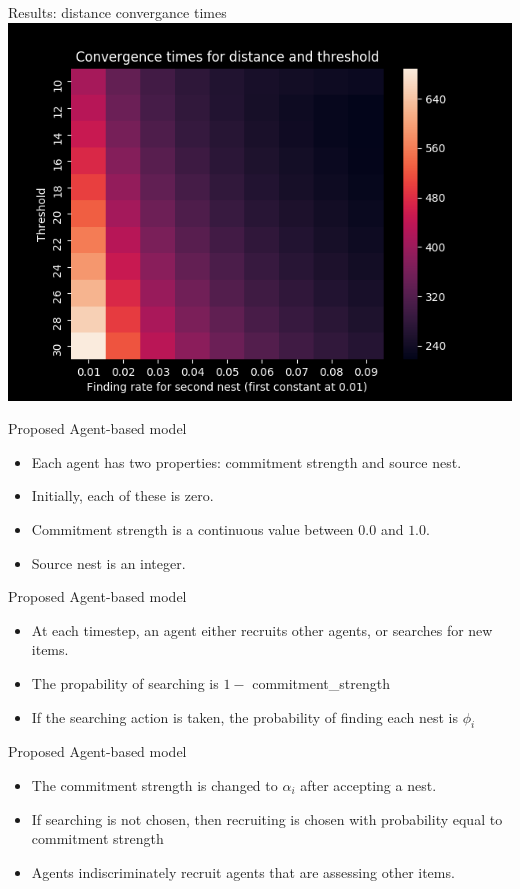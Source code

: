 \documentclass{beamer}
\begin{document}
\begin{frame}{Results: distance convergance times}
    \includegraphics[scale=0.7]{distance_convergance_times_t_over_10}
\end{frame}

\begin{frame}{Proposed Agent-based model}
    \begin{itemize}
        \item Each agent has two properties: commitment strength and source nest.
        \item Initially, each of these is zero.
        \item Commitment strength is a continuous value between $0.0$ and $1.0$.
        \item Source nest is an integer.
    \end{itemize}
\end{frame}

\begin{frame}{Proposed Agent-based model}
    \begin{itemize}
        \item At each timestep, an agent either recruits other agents, or searches for new items.
        \item The propability of searching is $1 - $ commitment\_strength
        \item If the searching action is taken, the probability of finding each nest is $\phi_i$
    \end{itemize}
\end{frame}

\begin{frame}{Proposed Agent-based model}
    \begin{itemize}
        \item The commitment strength is changed to $\alpha_i$ after accepting a nest.
        \item If searching is not chosen, then recruiting is chosen with probability equal to commitment strength
        \item Agents indiscriminately recruit agents that are assessing other items.
    \end{itemize}
\end{frame}
\end{document}
